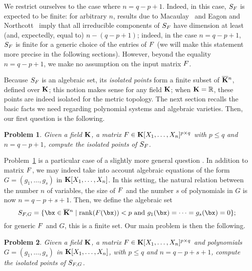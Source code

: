 \documentclass[12pt]{article}
\newtheorem{pbm}{Problem}
\begin{document}
We restrict ourselves to the case where $n = q-p+1$.  Indeed, in this
case, $S_{{F}}$ is expected to be finite: for arbitrary $n$, results due
to Macaulay~\cite{Macaulay16} and Eagon and Northcott~\cite{EN62}
imply that all irreducible components of $S_{{F}}$ have dimension at
least (and, expectedly, equal to) $n-(q-p+1)$; indeed, in the case
$n = q-p+1$, $S_{{F}}$ is finite for a generic choice of the entries of
${F}$ (we will make this statement more precise in the following
sections). However, beyond the equality $n = q-p+1$, we make no
assumption on the input matrix ${F}$.

Because $S_{{F}}$ is an algebraic set, its {\em isolated points} form a
finite subset of $\overline{\mathbf{K}}{}^n$, defined over $\mathbf{K}$; this notion makes
sense for any field $\mathbf{K}$; when $\mathbf{K}=\mathbb{R}$, these points are
indeed isolated for the metric topology. The next section recalls the
basic facts we need regarding polynomial systems and algebraic
varieties.  Then, our first question is the following.


\begin{pbm} \label{problem} 
  Given a field $\mathbf{K}$, a matrix ${F} \in \mathbf{K}[X_1,\dots,X_n]^{p \times q}$ with $p
  \leq q$ and $n = q-p+1$, compute the isolated points of $S_{{F}}$.
\end{pbm}

Problem~\ref{problem} is a particular case of a slightly more general
question%
. In addition to matrix ${F}$, we may indeed take into account
algebraic equations of the form $G=(g_1,\dots,g_s)$ in
$\mathbf{K}[X_1,\dots,X_n]$. In this setting, the natural relation between
the number $n$ of variables, the size of ${F}$ and the number $s$ of
polynomials in $G$ is now $n=q-p+s+1$. Then, we define the algebraic
set
$$S_{\mF,G} =  \{\bx \in \KKbar{}^n \mid
\mathrm{rank}(\mF({\bx})) < p \text{~and~}
g_1(\bx)=\cdots=g_s(\bx)=0   \};$$
for generic ${F}$ and $G$, this is a finite set. Our main problem is then
the following.
\begin{pbm} \label{problem2} 
  Given a field $\mathbf{K}$, a matrix ${F} \in \mathbf{K}[X_1,\dots,X_n]^{p \times q}$ and
  polynomials $G=(g_1,\dots,g_s)$ in $\mathbf{K}[X_1,\dots,X_n]$, with $p \leq q$ and
  $n = q-p+s+1$, compute the isolated points of $S_{{F},G}$.
\end{pbm}
\end{document}
